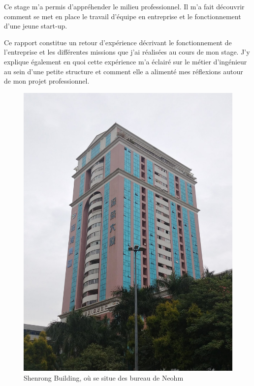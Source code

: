 \documentclass[a4paper, 12pt, sffamily]{report}
\begin{document}
Ce stage m’a permis d’appréhender le milieu professionnel. Il m’a fait découvrir comment se met en place le travail d'équipe en entreprise et le fonctionnement d'une jeune start-up.

Ce rapport constitue un retour d’expérience décrivant le fonctionnement de l’entreprise et les différentes missions que j’ai réalisées au cours de mon stage. J'y explique également en quoi cette expérience m’a éclairé sur le métier d’ingénieur au sein d’une petite structure et comment elle a alimenté mes réflexions autour de mon projet professionnel.

\begin{figure}
\centering
\includegraphics[scale=0.15]{figures/photos/photo_building.jpg}
\caption{Shenrong Building, où se situe des bureau de Neohm}
\label{fig:photo_building}
\end{figure}
\end{document}
